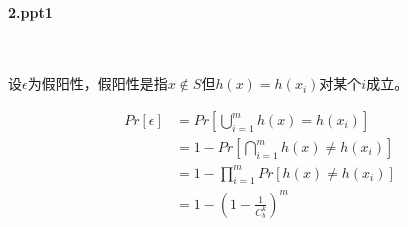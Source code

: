 \paragraph{2.ppt1}~{}

设$\epsilon$为假阳性，假阳性是指$x \notin S$但$h(x)=h(x_i)$对某个$i$成立。

$$
\begin{aligned}
    Pr[\epsilon] &= Pr[\bigcup_{i=1}^{m} h(x) = h(x_i)] \\
    &= 1-Pr[\bigcap_{i=1}^{m} h(x) \ne h(x_i)]\\
    &= 1-\prod_{i=1}^{m} Pr[h(x) \ne h(x_i)]\\
    &= 1-(1-\frac{1}{C_b^k})^m
\end{aligned}
$$
